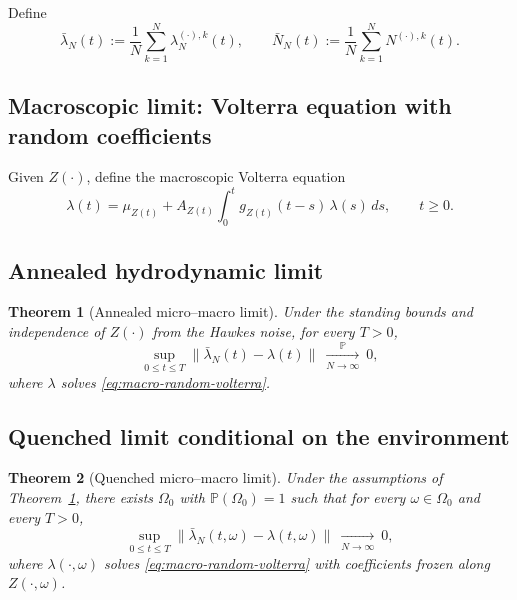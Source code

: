 \documentclass[12pt,a4paper]{article}
\theoremstyle{plain}
\newtheorem{theorem}{Theorem}[section]
\theoremstyle{definition}
\theoremstyle{remark}
\begin{document}
Define
\begin{equation}
	\label{eq:empirical-intensity}
	\bar\lambda_N(t):=\frac1N\sum_{k=1}^N \lambda_N^{(\cdot),k}(t),
	\qquad
	\bar N_N(t):=\frac1N\sum_{k=1}^N N^{(\cdot),k}(t).
\end{equation}

\subsection{Macroscopic limit: Volterra equation with random coefficients}
\label{subsec:macro-volterra}

Given $Z(\cdot)$, define the macroscopic Volterra equation
\begin{equation}
	\label{eq:macro-random-volterra}
	\lambda(t)
	=
	\mu_{Z(t)}
	+
	A_{Z(t)}\int_0^t g_{Z(t)}(t-s)\,\lambda(s)\,ds,
	\qquad t\ge 0.
\end{equation}

\subsection{Annealed hydrodynamic limit}
\label{subsec:annealed-limit}

\begin{theorem}[Annealed micro--macro limit]
	\label{thm:annealed-hawkes}
	Under the standing bounds and independence of $Z(\cdot)$ from the Hawkes noise,
	for every $T>0$,
	\[
	\sup_{0\le t\le T}\|\bar\lambda_N(t)-\lambda(t)\|
	\ \xrightarrow[N\to\infty]{\mathbb P}\ 0,
	\]
	where $\lambda$ solves \eqref{eq:macro-random-volterra}.
\end{theorem}

\subsection{Quenched limit conditional on the environment}
\label{subsec:quenched-limit}

\begin{theorem}[Quenched micro--macro limit]
	\label{thm:quenched-hawkes}
	Under the assumptions of Theorem~\ref{thm:annealed-hawkes}, there exists $\Omega_0$ with
	$\mathbb P(\Omega_0)=1$ such that for every $\omega\in\Omega_0$ and every $T>0$,
	\[
	\sup_{0\le t\le T}\|\bar\lambda_N(t,\omega)-\lambda(t,\omega)\|
	\ \xrightarrow[N\to\infty]{}\ 0,
	\]
	where $\lambda(\cdot,\omega)$ solves \eqref{eq:macro-random-volterra} with coefficients frozen along
	$Z(\cdot,\omega)$.
\end{theorem}
\end{document}
